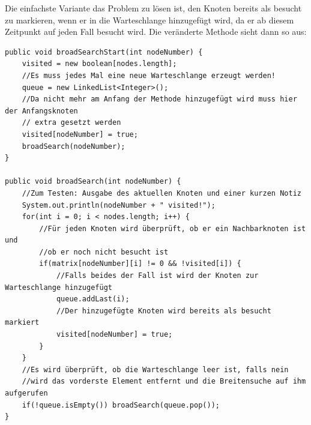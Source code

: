 \documentclass{article}
\begin{document}
Die einfachste Variante das Problem zu lösen ist, den Knoten bereits als besucht zu markieren, wenn er in die Warteschlange hinzugefügt wird, da er ab diesem Zeitpunkt auf jeden Fall besucht wird. Die veränderte Methode sieht dann so aus:
\begin{verbatim}
public void broadSearchStart(int nodeNumber) {
    visited = new boolean[nodes.length];
    //Es muss jedes Mal eine neue Warteschlange erzeugt werden!
    queue = new LinkedList<Integer>();
    //Da nicht mehr am Anfang der Methode hinzugefügt wird muss hier der Anfangsknoten
    // extra gesetzt werden
    visited[nodeNumber] = true;
    broadSearch(nodeNumber);
}

public void broadSearch(int nodeNumber) {
    //Zum Testen: Ausgabe des aktuellen Knoten und einer kurzen Notiz
    System.out.println(nodeNumber + " visited!");
    for(int i = 0; i < nodes.length; i++) {
        //Für jeden Knoten wird überprüft, ob er ein Nachbarknoten ist und
        //ob er noch nicht besucht ist
        if(matrix[nodeNumber][i] != 0 && !visited[i]) {
            //Falls beides der Fall ist wird der Knoten zur Warteschlange hinzugefügt
            queue.addLast(i);
            //Der hinzugefügte Knoten wird bereits als besucht markiert
            visited[nodeNumber] = true;
        }
    }
    //Es wird überprüft, ob die Warteschlange leer ist, falls nein
    //wird das vorderste Element entfernt und die Breitensuche auf ihm aufgerufen
    if(!queue.isEmpty()) broadSearch(queue.pop());
}
\end{verbatim}
\end{document}
